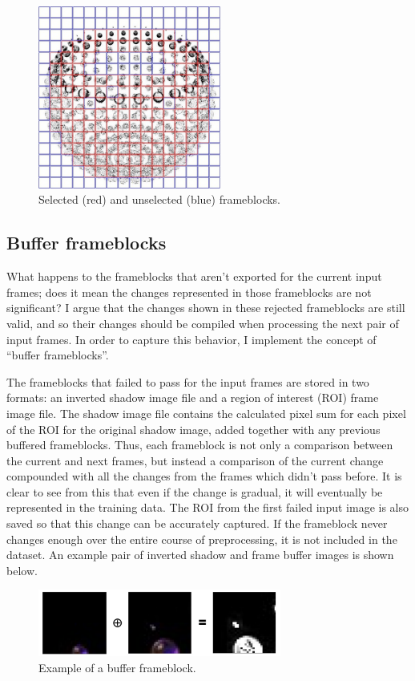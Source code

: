 \documentclass[conference]{IEEEtran}
\begin{document}
\begin{figure}[htbp]
\centerline{\includegraphics[width=6cm]{shadow_roi.png}}
\caption{Selected (red) and unselected (blue) frameblocks.}
\label{fig:shadow_roi}
\end{figure}

\subsection{Buffer frameblocks}
\label{subsec:buffer_frameblocks}
What happens to the frameblocks that aren't exported for the current input
frames; does it mean the changes represented in those frameblocks are not
significant? I argue that the changes shown in these rejected frameblocks are
still valid, and so their changes should be compiled when processing the next
pair of input frames.
In order to capture this behavior, I implement the concept of ``buffer
frameblocks''.

The frameblocks that failed to pass for the input frames are stored in two formats:
an inverted shadow image file and a region of interest (ROI) frame image file.
The shadow image file contains the calculated pixel sum for each pixel of the
ROI for the original shadow image,
added together with any previous buffered frameblocks.
Thus, each frameblock is not only a comparison between the current and next frames,
but instead a comparison of the current change compounded with all the changes from the frames
which didn't pass before.
It is clear to see from this that even if the change is gradual,
it will eventually be represented in the training data.
The ROI from the first failed input image is also saved so that this change can be accurately captured.
If the frameblock never changes enough over the entire course of preprocessing,
it is not included in the dataset.
An example pair of inverted shadow and frame buffer images is shown below.

\begin{figure}[htbp]
\centerline{\includegraphics[width=8cm]{buffer_frameblock.png}}
\caption{Example of a buffer frameblock.}
\label{fig:buffer_frameblock}
\end{figure}
\end{document}
